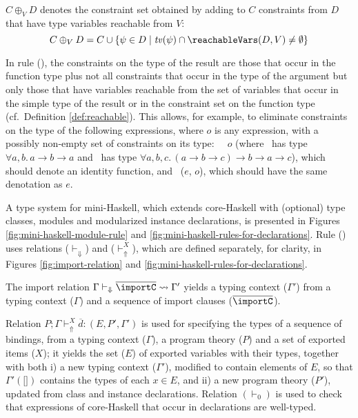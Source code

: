 
$C \oplus_V D$ denotes the constraint set obtained by adding to $C$
constraints from $D$ that have type variables reachable from $V$:
  \[ C \oplus_V D = C \cup \{ \psi \in D \mid \tv(\psi) \cap \reachableVars(D,V) \not= \emptyset \} \]

In rule (\APP), the constraints on the type of the result are those
that occur in the function type plus not all constraints that occur in
the type of the argument but only those that have variables reachable
from the set of variables that occur in the simple type of the result
or in the constraint set on the function type (cf.~Definition
\ref{def:reachable}).  This allows, for example, to eliminate
constraints on the type of the following expressions, where $o$ is any
expression, with a possibly non-empty set of constraints on its type:
{\tt \flip\ \const\ $o$} (where \const\ has type $\forall a, b.\,a
\rightarrow b \rightarrow a$ and \flip\ has type $\forall a, b, c.\,(a
\rightarrow b \rightarrow c) \rightarrow b \rightarrow a\rightarrow
c$), which should denote an identity function, and \fst\ ($e$, $o$),
which should have the same denotation as $e$.

A type system for mini-Haskell, which extends core-Haskell with
(optional) type classes, modules and modularized instance
declarations, is presented in Figures
\ref{fig:mini-haskell-module-rule} and
\ref{fig:mini-haskell-rules-for-declarations}. Rule (\MODULE) uses
relations ($\vdash_{\Downarrow}$) and ($\vdash_{\Uparrow}^X$), which
are defined separately, for clarity, in Figures
\ref{fig:import-relation} and
\ref{fig:mini-haskell-rules-for-declarations}.

The import relation $\Gamma \vdash_{\Downarrow} \overline{\importC}
\leadsto \Gamma'$ yields a typing context ($\Gamma'$) from a typing
context ($\Gamma$) and a sequence of import clauses
($\overline{\importC}$).

Relation $P;\Gamma \vdash_{\Uparrow}^X \overline{\!d}:(E,P',\Gamma')$
is used for specifying the types of a sequence of bindings, from a
typing context ($\Gamma$), a program theory ($P$) and a set of
exported items ($X$); it yields the set ($E$) of exported variables
with their types, together with both i) a new typing context
($\Gamma'$), modified to contain elements of $E$, so that
$\Gamma'(\texttt{[]})$ contains the types of each $x\in E$, and ii) a
new program theory ($P'$), updated from class and instance
declarations. Relation $(\vdash_0)$ is used to check that expressions
of core-Haskell that occur in declarations are well-typed.

